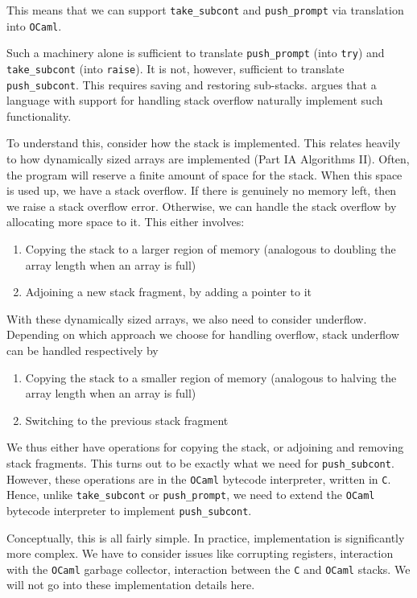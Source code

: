 This means that we can support \texttt{take\_subcont} and \texttt{push\_prompt} via translation into \texttt{OCaml}.

Such a machinery alone is sufficient to translate \texttt{push\_prompt} (into \texttt{try}) and \texttt{take\_subcont} (into \texttt{raise}). It is not, however, sufficient to translate \texttt{push\_subcont}. This requires saving and restoring sub-stacks. \citet{kisyelov-2014} argues that a language with support for handling stack overflow naturally implement such functionality. 

To understand this, consider how the stack is implemented. This relates heavily to how dynamically sized arrays are implemented (\textsf{Part IA Algorithms II}). Often, the program will reserve a finite amount of space for the stack. When this space is used up, we have a stack overflow. If there is genuinely no memory left, then we raise a stack overflow error. Otherwise, we can handle the stack overflow by allocating more space to it. This either involves:
\begin{enumerate}
    \item Copying the stack to a larger region of memory (analogous to doubling the array length when an array is full)
    \item Adjoining a new stack fragment, by adding a pointer to it
\end{enumerate}
With these dynamically sized arrays, we also need to consider underflow. Depending on which approach we choose for handling overflow, stack underflow can be handled respectively by
\begin{enumerate}
    \item Copying the stack to a smaller region of memory (analogous to halving the array length when an array is full)
    \item Switching to the previous stack fragment
\end{enumerate}
We thus either have operations for copying the stack, or adjoining and removing stack fragments. This turns out to be exactly what we need for \texttt{push\_subcont}. However, these operations are in the \texttt{OCaml} bytecode interpreter, written in \texttt{C}. Hence, unlike \texttt{take\_subcont} or \texttt{push\_prompt}, we need to extend the \texttt{OCaml} bytecode interpreter to implement \texttt{push\_subcont}. 

Conceptually, this is all fairly simple. In practice, implementation is significantly more complex. We have to consider issues like corrupting registers, interaction with the \texttt{OCaml} garbage collector, interaction between the \texttt{C} and \texttt{OCaml} stacks. We will not go into these implementation details here. 

